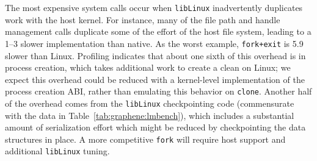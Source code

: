 The most expensive system calls occur when {\tt libLinux} inadvertently duplicates work
with the host kernel.  
For instance, many of the file path and handle management calls duplicate some of the effort of the host file system,
leading to a 1--3\x{} slower implementation than native.
As the worst example,
{\tt fork+exit} is 5.9\x{} slower than Linux.
Profiling indicates that about one sixth of this overhead is in process creation, which 
takes additional work to create a clean \picoproc{} on Linux; we expect this overhead could be reduced
with a kernel-level implementation of the process creation ABI, rather than emulating this behavior on {\tt clone}.
Another half of the overhead comes from the
{\tt libLinux} checkpointing code (commensurate with the data in Table~\ref{tab:graphene:lmbench}), which 
includes a substantial amount of serialization effort which might be reduced by checkpointing the data structures in place.
A more competitive {\tt fork} will require host support and additional {\tt libLinux} tuning.



